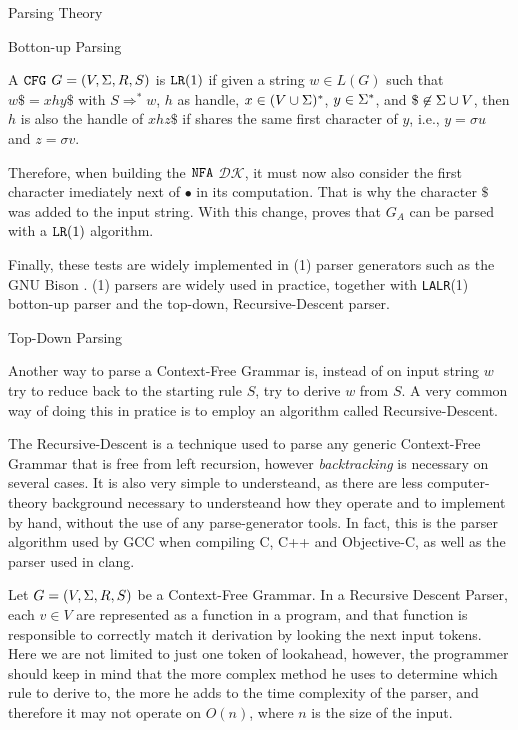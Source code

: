 \begin{section}{Parsing Theory}
\begin{subsection}{Botton-up Parsing}
\begin{definition}
A $\texttt{CFG}$ $G = (V, \Sigma, R, S)$ is $\texttt{LR}(1)$ if given a string
$w \in L(G)$ such that $w\$ = xhy \$$ with $S \Rightarrow^* w$, $h$ as
handle, $x \in (V \cup \Sigma)^*$, $y \in \Sigma^*$, and $ \$ \not\in \Sigma \cup V$,
then $h$ is also the handle of $xhz\$ $ if shares the same first character of $y$, i.e.,
$y = \sigma u$ and $z = \sigma v$.
\end{definition}

Therefore, when building the $\texttt{NFA}$ $\mathcal{DK}$, it must now also
consider the first character imediately next of $\bullet$ in its computation.
That is why the character $\$$ was added to the input string.
With this change, \cite{sipser2012} proves that $G_A$ can be parsed with a
$\texttt{LR}(1)$ algorithm.

Finally, these tests are widely implemented in (1) parser generators
such as the GNU Bison \citep{manual21bison}. (1) parsers are widely
used in practice, together with \texttt{LALR}(1) botton-up parser and the top-down,
Recursive-Descent parser.

\end{subsection}

\begin{subsection}{Top-Down Parsing}

Another way to parse a Context-Free Grammar is, instead of on input string $w$
try to reduce back to the starting rule $S$, try to derive $w$ from $S$.
A very common way of doing this in pratice is to employ an algorithm called
Recursive-Descent.

The Recursive-Descent is a technique used to parse any generic Context-Free
Grammar that is free from left recursion, however \textit{backtracking} is
necessary on several cases. It is also very simple to understeand, as there
are less computer-theory background necessary to understeand how they operate
and to implement by hand, without the use of any parse-generator tools.
In fact, this is the parser algorithm used by GCC when compiling C, C++ and
Objective-C, as well as the parser used in clang.

Let $G = (V, \Sigma, R, S)$ be a Context-Free Grammar. In a Recursive Descent
Parser, each $v \in V$ are represented as a function in a program, and
that function is responsible to correctly match it derivation by looking
the next input tokens. Here we are not limited to just one token of lookahead,
however, the programmer should keep in mind that the more complex method
he uses to determine which rule to derive to, the more he adds to the
time complexity of the parser, and therefore it may not operate on $O(n)$,
where $n$ is the size of the input.


\end{subsection}
\end{section}
